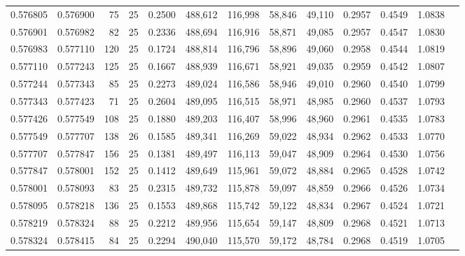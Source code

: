 \begin{tabular}{rrrrrrrrrrrrr}
0.576805 & 0.576900 &    75 &  25 &                                     0.2500 & 488,612 & 116,998 &  58,846 &  49,110 & 0.2957 & 0.4549 & 1.0838 \\
0.576901 & 0.576982 &    82 &  25 &                                     0.2336 & 488,694 & 116,916 &  58,871 &  49,085 & 0.2957 & 0.4547 & 1.0830 \\
0.576983 & 0.577110 &   120 &  25 &                                     0.1724 & 488,814 & 116,796 &  58,896 &  49,060 & 0.2958 & 0.4544 & 1.0819 \\
0.577110 & 0.577243 &   125 &  25 &                                     0.1667 & 488,939 & 116,671 &  58,921 &  49,035 & 0.2959 & 0.4542 & 1.0807 \\
0.577244 & 0.577343 &    85 &  25 &                                     0.2273 & 489,024 & 116,586 &  58,946 &  49,010 & 0.2960 & 0.4540 & 1.0799 \\
0.577343 & 0.577423 &    71 &  25 &                                     0.2604 & 489,095 & 116,515 &  58,971 &  48,985 & 0.2960 & 0.4537 & 1.0793 \\
0.577426 & 0.577549 &   108 &  25 &                                     0.1880 & 489,203 & 116,407 &  58,996 &  48,960 & 0.2961 & 0.4535 & 1.0783 \\
0.577549 & 0.577707 &   138 &  26 &                                     0.1585 & 489,341 & 116,269 &  59,022 &  48,934 & 0.2962 & 0.4533 & 1.0770 \\
0.577707 & 0.577847 &   156 &  25 &                                     0.1381 & 489,497 & 116,113 &  59,047 &  48,909 & 0.2964 & 0.4530 & 1.0756 \\
0.577847 & 0.578001 &   152 &  25 &                                     0.1412 & 489,649 & 115,961 &  59,072 &  48,884 & 0.2965 & 0.4528 & 1.0742 \\
0.578001 & 0.578093 &    83 &  25 &                                     0.2315 & 489,732 & 115,878 &  59,097 &  48,859 & 0.2966 & 0.4526 & 1.0734 \\
0.578095 & 0.578218 &   136 &  25 &                                     0.1553 & 489,868 & 115,742 &  59,122 &  48,834 & 0.2967 & 0.4524 & 1.0721 \\
0.578219 & 0.578324 &    88 &  25 &                                     0.2212 & 489,956 & 115,654 &  59,147 &  48,809 & 0.2968 & 0.4521 & 1.0713 \\
0.578324 & 0.578415 &    84 &  25 &                                     0.2294 & 490,040 & 115,570 &  59,172 &  48,784 & 0.2968 & 0.4519 & 1.0705 \\

\end{tabular}
